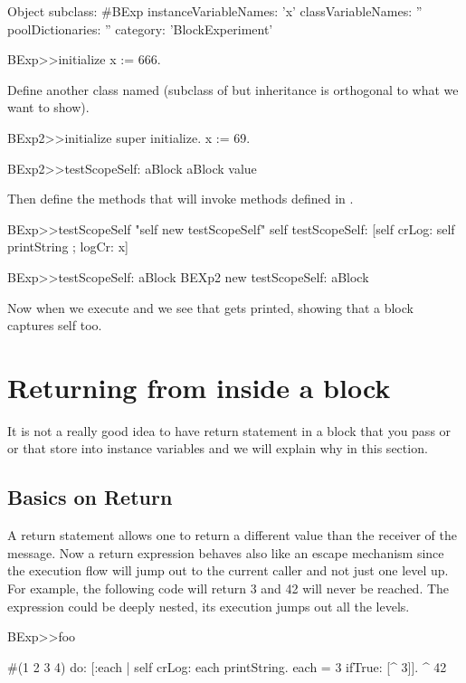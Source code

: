 \documentclass[a4paper,10pt,twoside]{book}
\begin{document}
\begin{code}{}
Object subclass: #BExp
	instanceVariableNames: 'x'
	classVariableNames: ''
	poolDictionaries: ''
	category: 'BlockExperiment'
\end{code}


\begin{code}{}
BExp>>initialize
	x := 666.
\end{code}	

Define another class named  (subclass of  but inheritance is orthogonal to what we want to show).


\begin{code}{}
BExp2>>initialize
	super initialize.
	x := 69.

BExp2>>testScopeSelf: aBlock
	aBlock value
\end{code}

Then define the methods that will invoke  methods defined in .
\begin{code}{}	
BExp>>testScopeSelf
	"self new testScopeSelf"
	self testScopeSelf: [self crLog: self printString ; logCr: x]

BExp>>testScopeSelf: aBlock
	BEXp2 new testScopeSelf: aBlock
\end{code}	

Now when we execute  and we see that  gets printed, showing that a block captures self too. 



\section{Returning from inside a block}
It is not a really good idea to have return statement in a block that you pass or or that store into instance variables and we will explain why in this section.

\subsection{Basics on Return}
A return statement allows one to return a different value than the receiver of the message.
Now a return expression behaves also like an escape mechanism since the execution flow will jump out to the current caller and not just one level up. For example, the following code will return 3 and 42 will never be reached. The expression \ct{[^3]} could be deeply nested, its execution jumps out all the levels.

\begin{code}{}
BExp>>foo
	
	#(1 2 3 4) do: [:each | self crLog: each printString. 
						each = 3 
							ifTrue: [^ 3]].						
	^ 42
\end{code}
\end{document}

